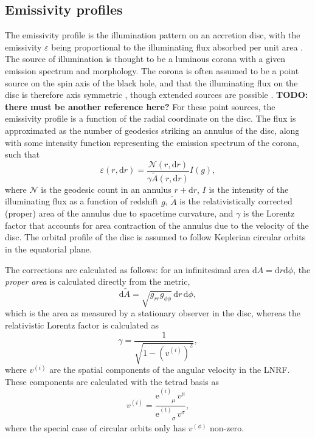 \documentclass[fleqn,usenatbib]{mnras}
\newcommand{\todo}[1]{{\noindent \bf \color{red} TODO: #1}}
\newcommand{\e}{\text{e}}
\renewcommand{\d}{\text{d}}
\newcommand{\utensor}[3]{#1^{#2}_{\phantom{#2}#3}}
\begin{document}
\subsection{Emissivity profiles}
\label{sec:emissivity-profiles}

The emissivity profile is the illumination pattern on an accretion disc, with the emissivity $\varepsilon$ being proportional to the illuminating flux absorbed per unit area \citep{laor_line_1991,wilkins_understanding_2012}. The source of illumination is thought to be a luminous corona with a given emission spectrum and morphology. The corona is often assumed to be a point source on the spin axis of the black hole, and that the illuminating flux on the disc is therefore axis symmetric \citep{fukumura_accretion_2007}, though extended sources are possible \citep{gonzalez_probing_2017}. \todo{there must be another reference here?} For these point sources, the emissivity profile is a function of the radial coordinate on the disc. The flux is approximated as the number of geodesics striking an annulus of the disc, along with some intensity function representing the emission spectrum of the corona, such that
\begin{equation}
    \varepsilon (r, \d r) = \frac{\mathcal{N}(r, \d r)}{\gamma \tilde{A}(r, \d r)} I(g),
\end{equation}
where $\mathcal{N}$ is the geodesic count in an annulus $r + \d r$, $I$ is the intensity of the illuminating flux as a function of redshift $g$, $\tilde{A}$ is the relativistically corrected (proper) area of the annulus due to spacetime curvature, and $\gamma$ is the Lorentz factor that accounts for area contraction of the annulus due to the velocity of the disc. The orbital profile of the disc is assumed to follow Keplerian circular orbits in the equatorial plane.

The corrections are calculated as follows: for an infinitesimal area $\d A = \d r \d\phi$, the \textit{proper area} is calculated directly from the metric,
\begin{equation}
    \d\tilde{A} = \sqrt{g_{rr} g_{\phi\phi}}\, \d r\, \d \phi,
\end{equation}
which is the area as measured by a stationary observer in the disc, whereas the relativistic Lorentz factor is calculated as
\begin{equation}
    \gamma = \frac{1}{\sqrt{1 - \left(v^{(i)}\right)^2}},
\end{equation}
where $v^{(i)}$ are the spatial components of the angular velocity in the LNRF. These components are calculated with the tetrad basis as
\begin{equation}
    v^{(i)} = \frac{\utensor{\e}{(i)}{\mu}\, v^\mu}{\utensor{\e}{(t)}{\sigma}\, v^\sigma},
\end{equation}
where the special case of circular orbits only has $v^{(\phi)}$ non-zero.
\end{document}
